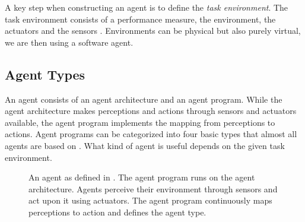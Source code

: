 \documentclass[../main.tex]{subfiles}
\begin{document}
A key step when constructing an agent is to define the \emph{task environment}.
The task environment consists of a performance measure, the environment, the actuators and the sensors \cite{Russel2022}.
Environments can be physical but also purely virtual, we are then using a software agent.

\subsection{Agent Types}

An agent consists of an agent architecture and an agent program.
While the agent architecture makes perceptions and actions through sensors and actuators available,
the agent program implements the mapping from perceptions to actions.
Agent programs can be categorized into four basic types that almost all agents are based on \cite{Russel2022}.
What kind of agent is useful depends on the given task environment.

\begin{figure}[t]
    \centering
    \caption{An agent as defined in \autocite{Russel2022}.
        The agent program runs on the agent architecture.
        Agents perceive their environment through sensors and act upon it using actuators.
        The agent program continuously maps perceptions to action and defines the agent type.}
    \label{fig:agent_overview}
\end{figure}
\end{document}

